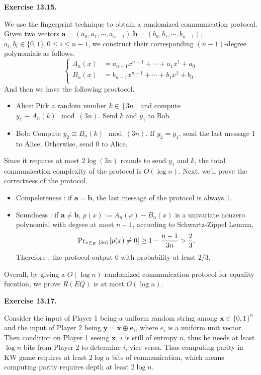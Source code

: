 \documentclass[a4paper]{article}
\newenvironment{exercise}[1]{
	\par
	\noindent\textbf{Exercise #1.}\quad
}{
	\par
	\bigskip
}
\newcommand{\bin}{\{0,1\}}
\begin{document}
    \begin{exercise}{13.15}
    	We use the fingerprint technique to obtain a randomized communication protocal. Given two vectors $\mathbf{a}=(a_0,a_1,\cdots,a_{n-1})$,$\mathbf{b}=(b_0,b_1,\cdots,b_{n-1})$, $ a_i,b_i \in \{0,1\}, 0\leq i \leq n-1 $, we construct their corresponding  $(n-1)$-degree polynomials as follows.
      \begin{equation*}
      	 \left\{
      	 	\begin{aligned}
      	 		A_n(x) &= a_{n-1} x^{n-1} + \cdots + a_1 x^1 + a_0 \\
      	 		B_n(x) &= b_{n-1} x^{n-1} + \cdots + b_1 x^1 + b_0 \\
      	 	\end{aligned}
      	 \right .
      \end{equation*}
      And then we have the following proctocol.
      \begin{itemize}
       \item Alice: Pick a random number $k \in \left[ 3n \right]$ and  compute $y_1\equiv A_n(k) \mod (3n) $. Send $k$ and $y_1$ to Bob.
       \item Bob: Compute $y_2 \equiv B_n(k) \mod (3n)$. If $y_2 = y_1$, send the last message 1 to Alice; Otherwise, send 0 to Alice. 
      \end{itemize}
      Since  it requires at most $2\log(3n)$ rounds to send $y_1$ and $k$,  the total communication complexity of the protocol is $O(\log n)$. Next, we'll prove the correctness of the protocol.
      \begin{itemize}
      		\item Compeleteness : if $\mathbf{a}= \mathbf{b}$, the last message of the protocol is always 1.
      		\item Soundness : if $\mathbf{a} \neq \mathbf{b}$, $p(x) := A_n(x) - B_n(x)$ is a univariate nonzero polynomial with degree at most $n-1$, according to Schwartz-Zippel Lemma,
      		\[
      			{\rm Pr}_{x\in_{R} ~[3n]}\left[p(x) \neq 0 \right] \geq 1- \frac{n-1}{3n} > \frac{2}{3} .
      		\]
            Therefore , the protocol output 0 with probability at least $2/3$. 
      \end{itemize} 
  Overall, by giving a $O(\log n)$ randomized communication protocol for equality fucntion, we prove $R(EQ)$ is at most $O(\log n)$.
    \end{exercise}

    \begin{exercise}{13.17}
        Consider the input of Player 1 being a uniform random string among $\bm x\in\bin^n$ and the input of Player 2 being $\bm y=\bm x\oplus\bm e_i$, where $e_i$ is a uniform unit vector. Then condition on Player 1 seeing $\bm x$, $i$ is still of entropy $n$, thus he needs at least $\log n$ bits from Player 2 to determine $i$, vice versa. Thus computing parity in KW game requires at least $2\log n$ bits of communication, which means computing parity requires depth at least $2\log n$.
    \end{exercise}
\end{document}
